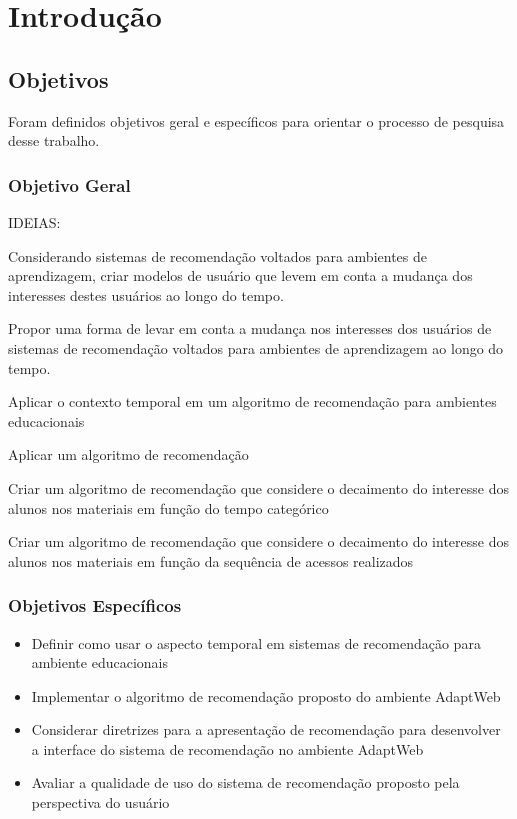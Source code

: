 \chapter{Introdução}\label{introducao}

\section{Objetivos}

Foram definidos objetivos geral e específicos para orientar o processo de pesquisa desse trabalho.

\subsection{Objetivo Geral}

IDEIAS:

Considerando sistemas de recomendação voltados para ambientes de aprendizagem, criar modelos de usuário que levem em
conta a mudança dos interesses destes usuários ao longo do tempo.

Propor uma forma de levar em conta a mudança nos interesses dos usuários de sistemas de recomendação voltados para ambientes
de aprendizagem ao longo do tempo.

Aplicar o contexto temporal em um algoritmo de recomendação para ambientes educacionais


Aplicar um algoritmo de recomendação

Criar um algoritmo de recomendação que considere o decaimento do interesse dos alunos nos materiais em função do
tempo categórico

Criar um algoritmo de recomendação que considere o decaimento do interesse dos alunos nos materiais em função da
sequência de acessos realizados


\subsection{Objetivos Específicos}

\begin{itemize}
\item Definir como usar o aspecto temporal em sistemas de recomendação para ambiente educacionais
\item Implementar o algoritmo de recomendação proposto do ambiente AdaptWeb\textsuperscript{\textregistered}
\item Considerar diretrizes para a apresentação de recomendação para desenvolver a interface do sistema de recomendação
no ambiente AdaptWeb\textsuperscript{\textregistered}
\item Avaliar a qualidade de uso do sistema de recomendação proposto pela perspectiva do usuário
\end{itemize}

